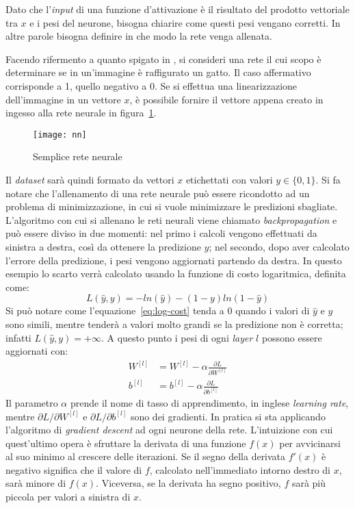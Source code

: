 Dato che l'\textit{input} di una funzione d'attivazione è il risultato del prodotto vettoriale tra $x$ e i pesi del neurone, bisogna chiarire come questi pesi vengano corretti.
In altre parole bisogna definire in che modo la rete venga allenata.

Facendo rifermento a quanto spigato in \cite{ng_deep_learning}, si consideri una rete il cui scopo è determinare se in un'immagine è raffigurato un gatto.
Il caso affermativo corrisponde a 1, quello negativo a 0.
Se si effettua una linearizzazione dell'immagine in un vettore $x$, è possibile fornire il vettore appena creato in ingesso alla rete neurale in figura~\ref{fig:nn}.
\begin{figure}[ht]
  \begin{center}
    \centering\texttt{[image: nn]}
  \end{center}
  \caption{Semplice rete neurale}
  \label{fig:nn}
\end{figure}
Il \textit{dataset} sarà quindi formato da vettori $x$ etichettati con valori $y \in \{0,1\}$.
Si fa notare che l'allenamento di una rete neurale può essere ricondotto ad un problema di minimizzazione, in cui si vuole minimizzare le predizioni sbagliate.
L'algoritmo con cui si allenano le reti neurali viene chiamato \textit{backpropagation} e può essere diviso in due momenti:
nel primo i calcoli vengono effettuati da sinistra a destra, così da ottenere la predizione $\hat y$;
nel secondo, dopo aver calcolato l'errore della predizione, i pesi vengono aggiornati partendo da destra.
In questo esempio lo scarto verrà calcolato usando la funzione di costo logaritmica, definita come:
\begin{equation} \label{eq:log-cost}
  L(\hat y, y) = - ln(\hat y) - (1-y) ln(1- \hat y)
\end{equation}
Si può notare come l'equazione~\ref{eq:log-cost} tenda a 0 quando i valori di $\hat y$ e $y$ sono simili, mentre tenderà a valori molto grandi se la predizione non è corretta; infatti $L(\hat y, y)= + \infty$.
A questo punto i pesi di ogni \textit{layer} $l$ possono essere aggiornati con:
\begin{align} \label{eq:grad-desc}
  W^{[l]} &= W^{[l]} - \alpha \frac{\partial L}{\partial W^{[l]}} \\
  b^{[l]} &= b^{[l]} - \alpha \frac{\partial L}{\partial b^{[l]}}
\end{align}
Il parametro $\alpha$ prende il nome di tasso di apprendimento, in inglese \textit{learning rate}, mentre $\partial L / \partial W^{[l]} $ e $\partial L / \partial b^{[l]}$ sono dei gradienti.
In pratica si sta applicando l'algoritmo di \textit{gradient descent} ad ogni neurone della rete.
L'intuizione con cui quest'ultimo opera è sfruttare la derivata di una funzione $f(x)$ per avvicinarsi al suo minimo al crescere delle iterazioni.
Se il segno della derivata $f'(x)$ è negativo significa che il valore di $f$, calcolato nell'immediato intorno destro di $x$, sarà minore di $f(x)$.
Viceversa, se la derivata ha segno positivo, $f$ sarà più piccola per valori a sinistra di $x$.

